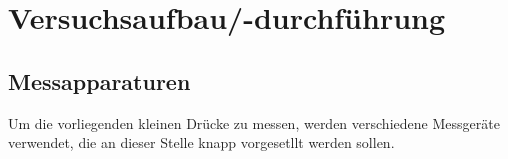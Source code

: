 \section{Versuchsaufbau/-durchführung}
\subsection{Messapparaturen}
Um die vorliegenden kleinen Drücke zu messen, werden verschiedene Messgeräte verwendet, die
an dieser Stelle knapp vorgesetllt werden sollen.  
